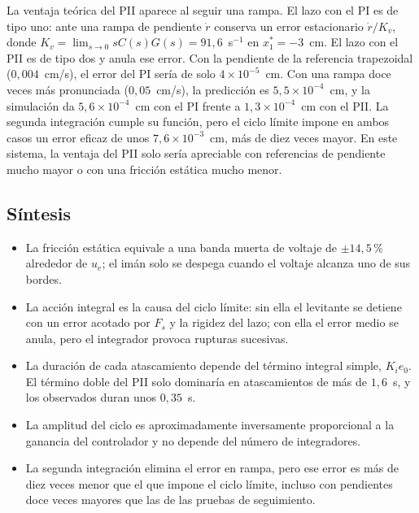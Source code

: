 La ventaja teórica del PII aparece al seguir una rampa. El lazo con el PI es de tipo uno: ante una rampa de pendiente $\dot r$ conserva un error estacionario $\dot r/K_v$, donde $K_v=\lim_{s\to0} sC(s)G(s)=91{,}6$~s$^{-1}$ en $x_1^*=-3$~cm. El lazo con el PII es de tipo dos y anula ese error. Con la pendiente de la referencia trapezoidal ($0{,}004$~cm/s), el error del PI sería de solo $4\times10^{-5}$~cm. Con una rampa doce veces más pronunciada ($0{,}05$~cm/s), la predicción es $5{,}5\times10^{-4}$~cm, y la simulación da $5{,}6\times10^{-4}$~cm con el PI frente a $1{,}3\times10^{-4}$~cm con el PII. La segunda integración cumple su función, pero el ciclo límite impone en ambos casos un error eficaz de unos $7{,}6\times10^{-3}$~cm, más de diez veces mayor. En este sistema, la ventaja del PII solo sería apreciable con referencias de pendiente mucho mayor o con una fricción estática mucho menor.

\subsection{Síntesis}

\begin{itemize}
  \item La fricción estática equivale a una banda muerta de voltaje de $\pm14{,}5$\,\% alrededor de $u_e$; el imán solo se despega cuando el voltaje alcanza uno de sus bordes.
  \item La acción integral es la causa del ciclo límite: sin ella el levitante se detiene con un error acotado por $F_s$ y la rigidez del lazo; con ella el error medio se anula, pero el integrador provoca rupturas sucesivas.
  \item La duración de cada atascamiento depende del término integral simple, $K_i e_0$. El término doble del PII solo dominaría en atascamientos de más de $1{,}6$~s, y los observados duran unos $0{,}35$~s.
  \item La amplitud del ciclo es aproximadamente inversamente proporcional a la ganancia del controlador y no depende del número de integradores.
  \item La segunda integración elimina el error en rampa, pero ese error es más de diez veces menor que el que impone el ciclo límite, incluso con pendientes doce veces mayores que las de las pruebas de seguimiento.
\end{itemize}

\FloatBarrier
